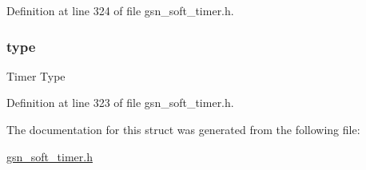 Definition at line 324 of file gsn\_\-soft\_\-timer.h.

\hypertarget{a00229_a631bceb766461ab7475c7ed56717aac8}{
\subsubsection[{type}]{ {\bf type}}}
\label{a00229_a631bceb766461ab7475c7ed56717aac8}
Timer Type 

Definition at line 323 of file gsn\_\-soft\_\-timer.h.



The documentation for this struct was generated from the following file:\begin{DoxyCompactItemize}
\item 
\hyperlink{a00586}{gsn\_\-soft\_\-timer.h}\end{DoxyCompactItemize}
